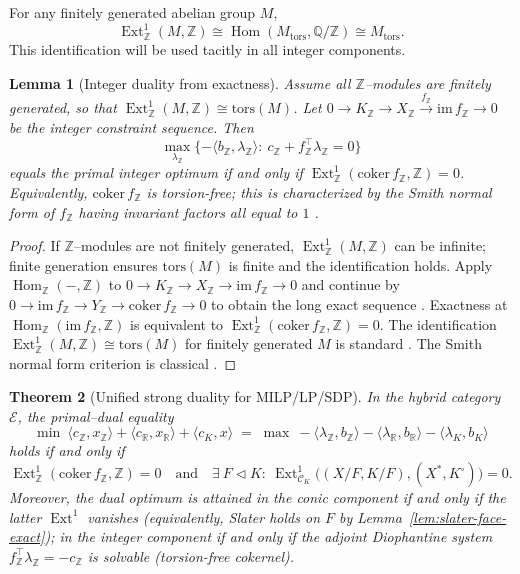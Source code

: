 \documentclass[12pt]{article}
\newcommand{\ZZ}{\mathbb{Z}}
\newcommand{\QQ}{\mathbb{Q}}
\newcommand{\Hom}{\operatorname{Hom}}
\newcommand{\Ext}{\operatorname{Ext}}
\theoremstyle{plain}
\newtheorem{theorem}{Theorem}[section]
\newtheorem{lemma}[theorem]{Lemma}
\theoremstyle{definition}
\theoremstyle{remark}
\numberwithin{equation}{section}
\begin{document}
For any finitely generated abelian group $M$,
\[
\Ext^1_\ZZ(M,\ZZ)\cong\Hom(M_{\mathrm{tors}},\QQ/\ZZ)
\cong M_{\mathrm{tors}}.
\]
This identification will be used tacitly in all integer components.

\begin{lemma}[Integer duality from exactness]\label{lem:integer-duality-exact}
Assume all $\mathbb Z$–modules are finitely generated, so that
$\Ext^1_{\mathbb Z}(M,\mathbb Z)\cong\mathrm{tors}(M)$.
Let $0\to K_{\mathbb Z}\to X_{\mathbb Z}\xrightarrow{f_{\mathbb Z}}\mathrm{im}\,f_{\mathbb Z}\to 0$ be the integer constraint sequence. Then
\[
\max_{\lambda_{\mathbb Z}}\{-\langle b_{\mathbb Z},\lambda_{\mathbb Z}\rangle:\ c_{\mathbb Z}+ f_{\mathbb Z}^\top\lambda_{\mathbb Z}=0\}
\]
equals the primal integer optimum if and only if $\Ext^1_{\mathbb Z}(\mathrm{coker}\,f_{\mathbb Z},\mathbb Z)=0$. Equivalently, $\mathrm{coker}\,f_{\mathbb Z}$ is torsion-free; this is characterized by the Smith normal form of $f_{\mathbb Z}$ having invariant factors all equal to $1$ \cite{Schrijver1986}.
\end{lemma}

\begin{proof} If $\mathbb Z$–modules are not finitely generated, $\Ext^1_{\mathbb Z}(M,\mathbb Z)$ can be infinite; finite generation ensures $\mathrm{tors}(M)$ is finite and the identification holds.
Apply $\Hom_{\mathbb Z}(-,\mathbb Z)$ to $0\to K_{\mathbb Z}\to X_{\mathbb Z}\to \mathrm{im}\,f_{\mathbb Z}\to 0$ and continue by $0\to \mathrm{im}\,f_{\mathbb Z}\to Y_{\mathbb Z}\to \mathrm{coker}\,f_{\mathbb Z}\to 0$ to obtain the long exact sequence \cite{Weibel1994}. Exactness at $\Hom_{\mathbb Z}(\mathrm{im}\,f_{\mathbb Z},\mathbb Z)$ is equivalent to $\Ext^1_{\mathbb Z}(\mathrm{coker}\,f_{\mathbb Z},\mathbb Z)=0$. The identification $\Ext^1_{\mathbb Z}(M,\mathbb Z)\cong \mathrm{tors}(M)$ for finitely generated $M$ is standard \cite{Weibel1994}. The Smith normal form criterion is classical \cite{Schrijver1986}.
\end{proof}

\begin{theorem}[Unified strong duality for MILP/LP/SDP]\label{thm:unified-strong}
In the hybrid category $\mathcal E$, the primal–dual equality
\[
\min\ \langle c_{\mathbb Z},x_{\mathbb Z}\rangle + \langle c_{\mathbb R},x_{\mathbb R}\rangle + \langle c_K,x\rangle \;=\; \max\ -\langle \lambda_{\mathbb Z},b_{\mathbb Z}\rangle - \langle \lambda_{\mathbb R},b_{\mathbb R}\rangle - \langle \lambda_K,b_K\rangle
\]
holds if and only if
\[
\Ext^1_{\mathbb Z}(\mathrm{coker}\,f_{\mathbb Z},\mathbb Z)=0
\quad\text{and}\quad
\exists\ F\triangleleft K:\ \Ext^1_{\mathcal C_K}\big((X/F,K/F),(X^*,K^\circ)\big)=0.
\]
Moreover, the dual optimum is attained in the conic component if and only if the latter $\Ext^1$ vanishes (equivalently, Slater holds on $F$ by Lemma~\ref{lem:slater-face-exact}); in the integer component if and only if the adjoint Diophantine system $f_{\mathbb Z}^\top\lambda_{\mathbb Z}=-c_{\mathbb Z}$ is solvable (torsion-free cokernel).
\end{theorem}
\end{document}
